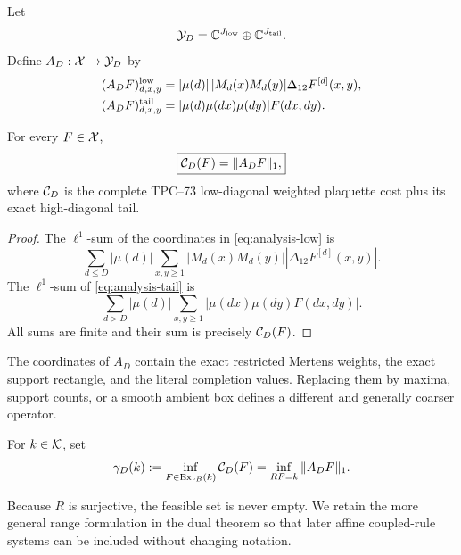 \begin{definition}
\label{def:analysis-operator}
Let
\[
 \mathcal Y_D=\mathbb C^{J_{\rm low}}\oplus\mathbb C^{J_{\rm tail}}.
\]
Define \(A_D:\mathcal X\to\mathcal Y_D\) by
\begin{align}
 (A_DF)_{d,x,y}^{\rm low}
 &=
 |\mu(d)|\,|M_d(x)M_d(y)|
 \Delta_{12}F^{[d]}(x,y),
 \label{eq:analysis-low}\\
 (A_DF)_{d,x,y}^{\rm tail}
 &=
 |\mu(d)\mu(dx)\mu(dy)|F(dx,dy).
 \label{eq:analysis-tail}
\end{align}
\end{definition}

\begin{proposition}
\label{prop:exact-normal-form}
For every \(F\in\mathcal X\),
\begin{equation}
 \boxed{\mathcal C_D(F)=\|A_DF\|_1,}
 \label{eq:cost-as-l1}
\end{equation}
where \(\mathcal C_D\) is the complete TPC--73 low-diagonal weighted plaquette
cost plus its exact high-diagonal tail.
\end{proposition}

\begin{proof}
The \(\ell^1\)-sum of the coordinates in
\eqref{eq:analysis-low} is
\[
 \sum_{d\le D}|\mu(d)|
 \sum_{x,y\ge1}
 |M_d(x)M_d(y)|
 |\Delta_{12}F^{[d]}(x,y)|.
\]
The \(\ell^1\)-sum of \eqref{eq:analysis-tail} is
\[
 \sum_{d>D}|\mu(d)|
 \sum_{x,y\ge1}
 |\mu(dx)\mu(dy)F(dx,dy)|.
\]
All sums are finite and their sum is precisely \(\mathcal C_D(F)\).
\end{proof}

\begin{remark}
The coordinates of \(A_D\) contain the exact restricted Mertens weights,
the exact support rectangle, and the literal completion values.  Replacing
them by maxima, support counts, or a smooth ambient box defines a
different and generally coarser operator.
\end{remark}

\begin{definition}
\label{def:completion-gauge}
For \(k\in\mathcal K\), set
\begin{equation}
 \gamma_D(k)
 :=
 \inf_{F\in\operatorname{Ext}_B(k)}\mathcal C_D(F)
 =
 \inf_{RF=k}\|A_DF\|_1.
 \label{eq:completion-gauge}
\end{equation}
\end{definition}

Because \(R\) is surjective, the feasible set is never empty.  We retain
the more general range formulation in the dual theorem so that later
affine coupled-rule systems can be included without changing notation.
